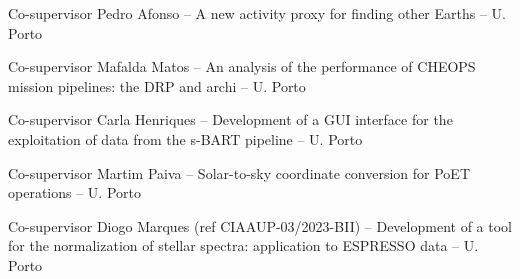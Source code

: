 
\begin{rubric}{}




\entry*[\dates{2022-11/2023-02}]
	Co-supervisor   Pedro Afonso -- A new activity proxy for finding other Earths -- U. Porto

\entry*[\dates{2020-02/2020-06}]
	Co-supervisor   Mafalda Matos -- An analysis of the performance of CHEOPS mission pipelines: the DRP and archi -- U. Porto


	Co-supervisor   Carla Henriques -- Development of a GUI interface for the exploitation of data from the s-BART pipeline  -- U. Porto

	Co-supervisor   Martim Paiva -- Solar-to-sky coordinate conversion for PoET operations  -- U. Porto


\entry*[\dates{2023-03/2023-06}]
	Co-supervisor   Diogo Marques (ref CIAAUP-03/2023-BII) -- Development of a tool for the normalization of stellar spectra: application to ESPRESSO data  -- U. Porto


\end{rubric}
